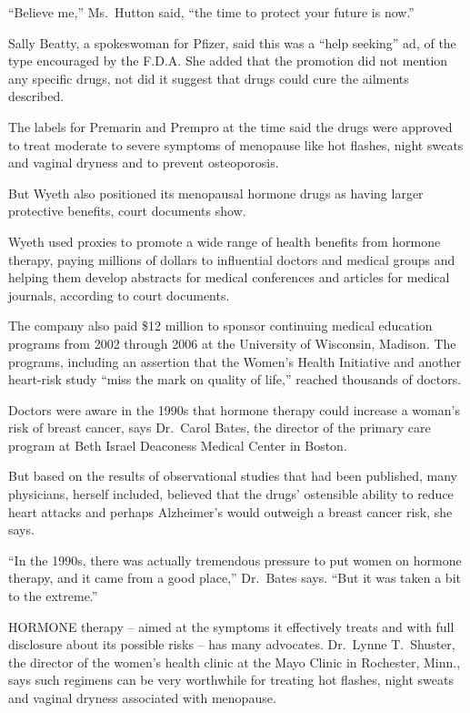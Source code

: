 ﻿\documentclass[12pt]{article}
\begin{document}
``Believe me,'' Ms.~Hutton said, ``the time to protect your future is now.''

Sally Beatty, a spokeswoman for Pfizer, said this was a ``help seeking'' ad, of the type encouraged
by the F.D.A. She added that the promotion did not mention any specific drugs, not did it suggest
that drugs could cure the ailments described.

The labels for Premarin and Prempro at the time said the drugs were approved to treat moderate to
severe symptoms of menopause like hot flashes, night sweats and vaginal dryness and to prevent
osteoporosis.

But Wyeth also positioned its menopausal hormone drugs as having larger protective benefits, court
documents show.

Wyeth used proxies to promote a wide range of health benefits from hormone therapy, paying millions
of dollars to influential doctors and medical groups and helping them develop abstracts for medical
conferences and articles for medical journals, according to court documents.

The company also paid \$12 million to sponsor continuing medical education programs from 2002
through 2006 at the University of Wisconsin, Madison. The programs, including an assertion that the
Women's Health Initiative and another heart-risk study ``miss the mark on quality of life,'' reached
thousands of doctors.

Doctors were aware in the 1990s that hormone therapy could increase a woman's risk of breast cancer,
says Dr.~Carol Bates, the director of the primary care program at Beth Israel Deaconess Medical
Center in Boston.

But based on the results of observational studies that had been published, many physicians, herself
included, believed that the drugs' ostensible ability to reduce heart attacks and perhaps
Alzheimer's would outweigh a breast cancer risk, she says.

``In the 1990s, there was actually tremendous pressure to put women on hormone therapy, and it came
from a good place,'' Dr.~Bates says. ``But it was taken a bit to the extreme.''

HORMONE therapy -- aimed at the symptoms it effectively treats and with full disclosure about its
possible risks -- has many advocates. Dr.~Lynne T.~Shuster, the director of the women's health
clinic at the Mayo Clinic in Rochester, Minn., says such regimens can be very worthwhile for
treating hot flashes, night sweats and vaginal dryness associated with menopause.
\end{document}
